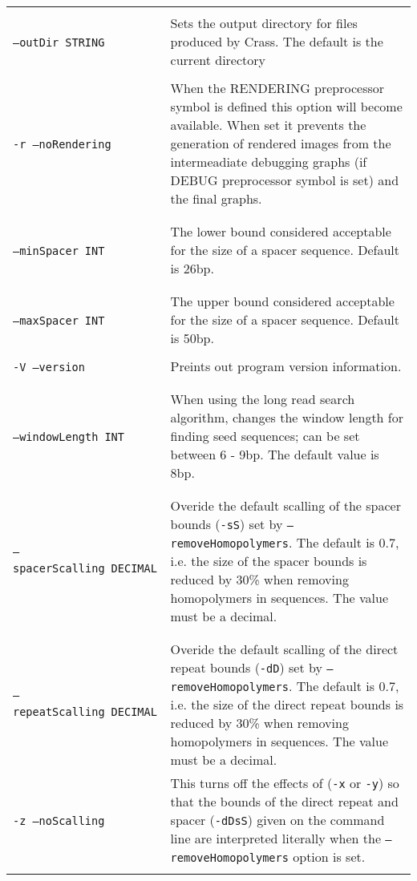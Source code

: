 \documentclass[11pt]{article} %
\newcommand{\optionflag}[1]{\texttt{-#1}}
\newcommand{\optionflagarg}[2]{\optionflag{#1}\ \texttt{#2}}
\newcommand{\longoptionflag}[1]{\texttt{--#1}}
\newcommand{\longoptionflagarg}[2]{\longoptionflag{#1}\ \texttt{#2}}
\newcommand{\combinedoptionflag}[2]{\optionflag{#1}\ \longoptionflag{#2}}
\newcommand{
	\combinedoptionflagarg}[3]{
		\shortstack[l]{
			\optionflagarg{#1}{#3} \\ \longoptionflagarg{#2}{#3}
		}
	}
\begin{document}
\begin{longtable}{  l   p{10cm} }
\combinedoptionflagarg{o}{outDir}{STRING} & Sets the output directory for files produced by Crass.  The default is the current directory\\ \\
\combinedoptionflag{r}{noRendering} & When the RENDERING preprocessor symbol is defined this option will become available.  When set it prevents the generation of rendered images from the intermeadiate debugging graphs (if DEBUG preprocessor symbol is set) and the final graphs.\\ \\
\combinedoptionflagarg{s}{minSpacer}{INT} & The lower bound considered acceptable for the size of a spacer sequence. Default is 26bp.\\ \\
\combinedoptionflagarg{S}{maxSpacer}{INT} & The upper bound considered acceptable for the size of a spacer sequence. Default is 50bp.\\ \\
\combinedoptionflag{V}{version} & Preints out program version information. \\ \\
\combinedoptionflagarg{w}{windowLength}{INT} & When using the long read search algorithm, changes the window length for finding seed sequences; can be set between 6 - 9bp.  The default value is 8bp.\\ \\ 
\combinedoptionflagarg{x}{spacerScalling}{DECIMAL} & Overide the default scalling of the spacer bounds (\optionflag{sS}) set by \longoptionflag{removeHomopolymers}.  The default is 0.7, i.e. the size of the spacer bounds is reduced by 30\% when removing homopolymers in sequences.  The value must be a decimal.   \\ \\
\combinedoptionflagarg{y}{repeatScalling}{DECIMAL} & Overide the default scalling of the direct repeat bounds (\optionflag{dD}) set by \longoptionflag{removeHomopolymers}.  The default is 0.7, i.e. the size of the direct repeat bounds is reduced by 30\% when removing homopolymers in sequences.  The value must be a decimal.\\ 
\combinedoptionflag{z}{noScalling} & This turns off the effects of (\optionflag{x} or \optionflag{y}) so that the bounds of the direct repeat and spacer (\optionflag{dDsS}) given on the command line are interpreted literally when the \longoptionflag{removeHomopolymers} option is set. \\ \\
\hline
    \end{longtable}
\end{document}
